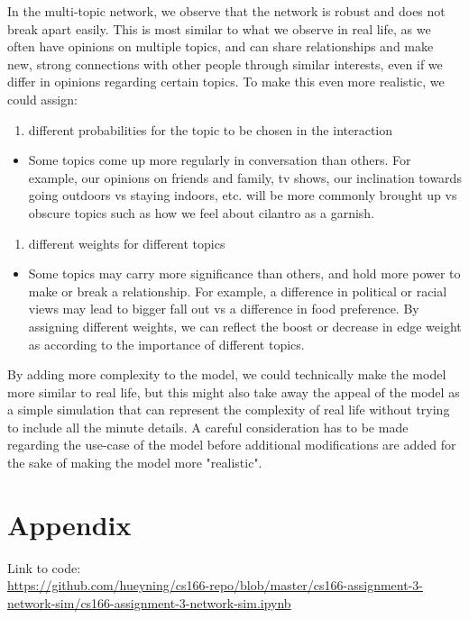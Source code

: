 \documentclass[11pt]{article}
\providecommand{\tightlist}{%
      \setlength{\itemsep}{0pt}\setlength{\parskip}{0pt}}
\begin{document}
In the multi-topic network, we observe that the network is robust and
does not break apart easily. This is most similar to what we observe in
real life, as we often have opinions on multiple topics, and can share
relationships and make new, strong connections with other people through
similar interests, even if we differ in opinions regarding certain
topics. To make this even more realistic, we could assign:

\begin{enumerate}
\def\labelenumi{\alph{enumi})}
\tightlist
\item
  different probabilities for the topic to be chosen in the interaction
\end{enumerate}

\begin{itemize}
\tightlist
\item
  Some topics come up more regularly in conversation than others. For
  example, our opinions on friends and family, tv shows, our inclination
  towards going outdoors vs staying indoors, etc. will be more commonly
  brought up vs obscure topics such as how we feel about cilantro as a
  garnish.
\end{itemize}

\begin{enumerate}
\def\labelenumi{\alph{enumi})}
\setcounter{enumi}{1}
\tightlist
\item
  different weights for different topics
\end{enumerate}

\begin{itemize}
\tightlist
\item
  Some topics may carry more significance than others, and hold more
  power to make or break a relationship. For example, a difference in
  political or racial views may lead to bigger fall out vs a difference
  in food preference. By assigning different weights, we can reflect the
  boost or decrease in edge weight as according to the importance of
  different topics.
\end{itemize}

By adding more complexity to the model, we could technically make the
model more similar to real life, but this might also take away the
appeal of the model as a simple simulation that can represent the
complexity of real life without trying to include all the minute
details. A careful consideration has to be made regarding the use-case
of the model before additional modifications are added for the sake of
making the model more "realistic".

\section{Appendix}

Link to code: \\
\url{https://github.com/hueyning/cs166-repo/blob/master/cs166-assignment-3-network-sim/cs166-assignment-3-network-sim.ipynb}


    
    
    
    
\end{document}
